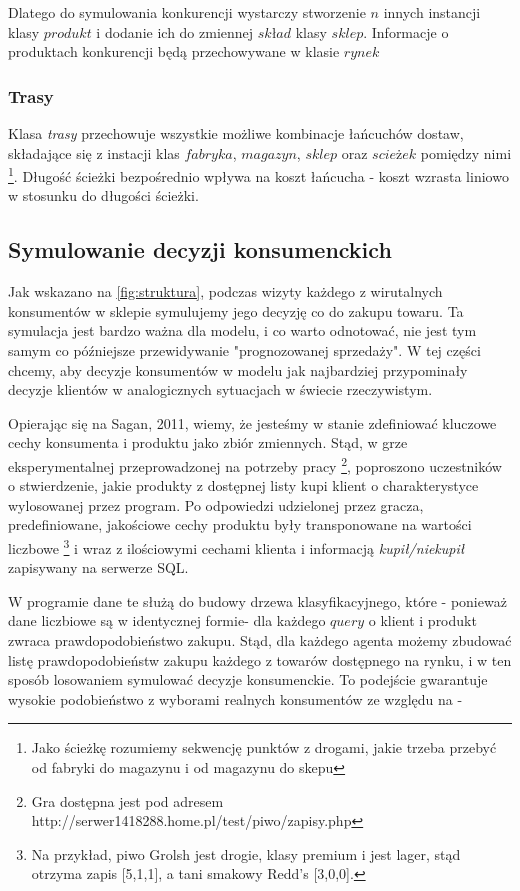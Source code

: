 \documentclass{article}
\begin{document}
Dlatego do symulowania konkurencji wystarczy stworzenie $n$ innych instancji klasy $produkt$ i dodanie ich do zmiennej $skład$ klasy $sklep$. Informacje o produktach konkurencji będą przechowywane w klasie $rynek$

\subsubsection{Trasy}

Klasa \textit{trasy} przechowuje wszystkie możliwe kombinacje łańcuchów dostaw, składające się z instacji klas $fabryka$, $magazyn$, $sklep$ oraz $scieżek$ pomiędzy nimi \footnote{Jako ścieżkę rozumiemy sekwencję punktów z drogami, jakie trzeba przebyć od fabryki do magazynu i od magazynu do skepu}. Długość ścieżki bezpośrednio wpływa na koszt łańcucha - koszt wzrasta liniowo w stosunku do długości ścieżki.

\subsection{Symulowanie decyzji konsumenckich}

Jak wskazano na \ref{fig:struktura}, podczas wizyty każdego z wirutalnych konsumentów w sklepie symulujemy jego decyzję co do zakupu towaru. Ta symulacja jest bardzo ważna dla modelu, i co warto odnotować, nie jest tym samym co późniejsze przewidywanie "prognozowanej sprzedaży". W tej części chcemy, aby decyzje konsumentów w modelu jak najbardziej przypominały decyzje klientów w analogicznych sytuacjach w świecie rzeczywistym. 

Opierając się na Sagan, 2011, wiemy, że jesteśmy w stanie zdefiniować kluczowe cechy konsumenta i produktu jako zbiór zmiennych. Stąd, w grze eksperymentalnej przeprowadzonej na potrzeby pracy \footnote{Gra dostępna jest pod adresem http://serwer1418288.home.pl/test/piwo/zapisy.php}, poproszono uczestników o stwierdzenie, jakie produkty z dostępnej listy kupi klient o charakterystyce wylosowanej przez program. Po odpowiedzi udzielonej przez gracza, predefiniowane, jakościowe cechy produktu były transponowane na wartości liczbowe \footnote{Na przykład, piwo Grolsh jest drogie, klasy premium i jest lager, stąd otrzyma zapis [5,1,1], a tani smakowy Redd's [3,0,0].} i wraz z ilościowymi cechami klienta i informacją \textit{kupił/niekupił} zapisywany na serwerze SQL. 

W programie dane te służą do budowy drzewa klasyfikacyjnego, które - ponieważ dane liczbiowe są w identycznej formie- dla każdego $query$ o klient i produkt zwraca prawdopodobieństwo zakupu. Stąd, dla każdego agenta możemy zbudować listę prawdopodobieństw zakupu każdego z towarów dostępnego na rynku, i w ten sposób losowaniem symulować decyzje konsumenckie. To podejście gwarantuje wysokie podobieństwo z wyborami realnych konsumentów ze względu na - 
\end{document}
